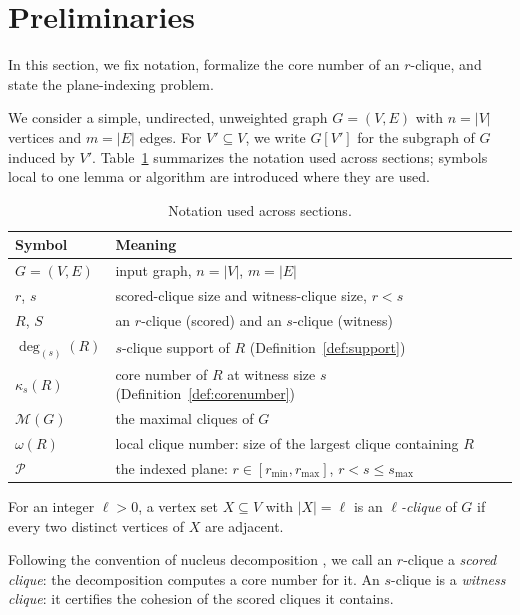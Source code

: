 \section{Preliminaries}\label{sec:preliminaries}
In this section, we fix notation, formalize the core number of an $r$-clique, and state the plane-indexing problem.

We consider a simple, undirected, unweighted graph $G=(V,E)$ with $n=|V|$ vertices and $m=|E|$ edges.
%
For $V'\subseteq V$, we write $G[V']$ for the subgraph of $G$ induced by $V'$.
%
Table~\ref{tab:notation} summarizes the notation used across sections; symbols local to one lemma or algorithm are introduced where they are used.

\begin{table}[t]
\centering
\caption{Notation used across sections.}\label{tab:notation}
\small
\begin{tabular}{@{}ll@{}}
\toprule
\textbf{Symbol} & \textbf{Meaning}\\
\midrule
$G=(V,E)$ & input graph, $n=|V|$, $m=|E|$\\
$r$, $s$ & scored-clique size and witness-clique size, $r<s$\\
$R$, $S$ & an $r$-clique (scored) and an $s$-clique (witness)\\
$\deg_{(s)}(R)$ & $s$-clique support of $R$ (Definition~\ref{def:support})\\
$\kappa_s(R)$ & core number of $R$ at witness size $s$ (Definition~\ref{def:corenumber})\\
$\mathcal{M}(G)$ & the maximal cliques of $G$\\
$\omega(R)$ & local clique number: size of the largest clique containing $R$\\
$\mathcal{P}$ & the indexed plane: $r\in[r_{\min},r_{\max}]$, $r<s\le s_{\max}$\\
\bottomrule
\end{tabular}
\end{table}

\begin{definition}\label{def:clique}
For an integer $\ell>0$, a vertex set $X\subseteq V$ with $|X|=\ell$ is an \emph{$\ell$-clique} of $G$ if every two distinct vertices of $X$ are adjacent.
\end{definition}

Following the convention of nucleus decomposition \cite{firstNucleus,NuclearCD}, we call an $r$-clique a \emph{scored clique}: the decomposition computes a core number for it.
%
An $s$-clique is a \emph{witness clique}: it certifies the cohesion of the scored cliques it contains.


